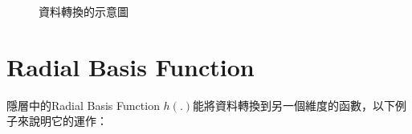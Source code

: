 \begin{figure}[htbp!]
	\centering


	\caption{資料轉換的示意圖}
\end{figure}



\section{Radial Basis Function}
隱層中的Radial Basis Function \(h(.)\)能將資料轉換到另一個維度的函數，以下例子來說明它的運作：

